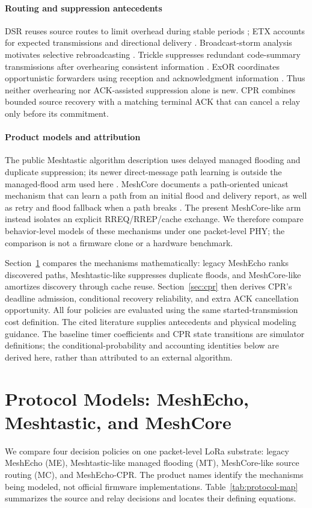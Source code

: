 \documentclass[conference,letterpaper,10pt]{IEEEtran}
\begin{document}
\paragraph{Routing and suppression antecedents}
DSR reuses source routes to limit overhead during stable periods
\cite{johnson1996dsr}; ETX accounts for expected transmissions and
directional delivery \cite{decouto2003etx}. Broadcast-storm analysis
motivates selective rebroadcasting \cite{ni1999broadcaststorm}.
Trickle suppresses redundant code-summary transmissions after overhearing
consistent information \cite{levis2004trickle}. ExOR coordinates
opportunistic forwarders using reception and acknowledgment information
\cite{biswas2005exor}. Thus neither overhearing nor ACK-assisted suppression
alone is new. CPR combines bounded source recovery with a matching
terminal ACK that can cancel a relay only before its commitment.

\paragraph{Product models and attribution}
The public Meshtastic algorithm description uses delayed managed flooding and
duplicate suppression; its newer direct-message path learning is outside the
managed-flood arm used here \cite{meshtasticdocs}. MeshCore documents a
path-oriented unicast mechanism that can learn a path from an initial flood and
delivery report, as well as retry and flood fallback when a path breaks
\cite{meshcore}. The present MeshCore-like arm instead isolates an explicit
RREQ/RREP/cache exchange. We therefore compare behavior-level
models of these mechanisms under one packet-level PHY; the comparison is not a
firmware clone or a hardware benchmark.

Section~\ref{sec:models} compares the mechanisms mathematically: legacy
MeshEcho ranks discovered paths, Meshtastic-like suppresses duplicate
floods, and MeshCore-like amortizes discovery through cache reuse.
Section~\ref{sec:cpr} then derives CPR's deadline admission, conditional
recovery reliability, and extra ACK cancellation opportunity. All four
policies are evaluated using the same started-transmission cost definition.
The cited literature supplies antecedents and physical modeling guidance.
The baseline timer coefficients and CPR state transitions are simulator
definitions; the conditional-probability and accounting identities below
are derived here, rather than attributed to an external algorithm.

\section{Protocol Models: MeshEcho, Meshtastic, and MeshCore}
\label{sec:models}
We compare four decision policies on one packet-level LoRa substrate:
legacy MeshEcho (ME), Meshtastic-like managed flooding (MT), MeshCore-like
source routing (MC), and MeshEcho-CPR. The product names identify the mechanisms
being modeled, not official firmware implementations. Table~\ref{tab:protocol-map}
summarizes the source and relay decisions and locates their defining equations.
\end{document}
